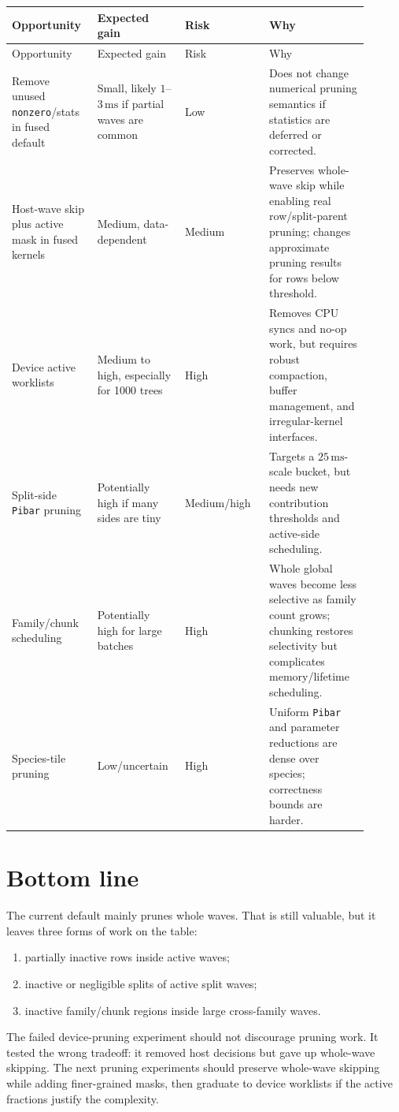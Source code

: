\documentclass[11pt]{article}
\newcommand{\ms}{\,\mathrm{ms}}
\newcommand{\code}[1]{\texttt{#1}}
\begin{document}
\begin{longtable}{p{0.20\linewidth}p{0.22\linewidth}p{0.22\linewidth}p{0.26\linewidth}}
\toprule
Opportunity & Expected gain & Risk & Why \\
\midrule
\endfirsthead
\toprule
Opportunity & Expected gain & Risk & Why \\
\midrule
\endhead

Remove unused \code{nonzero}/stats in fused default & Small, likely $1$--$3\ms$ if partial waves are common & Low & Does not change numerical pruning semantics if statistics are deferred or corrected. \\

Host-wave skip plus active mask in fused kernels & Medium, data-dependent & Medium & Preserves whole-wave skip while enabling real row/split-parent pruning; changes approximate pruning results for rows below threshold. \\

Device active worklists & Medium to high, especially for 1000 trees & High & Removes CPU syncs and no-op work, but requires robust compaction, buffer management, and irregular-kernel interfaces. \\

Split-side \code{Pibar} pruning & Potentially high if many sides are tiny & Medium/high & Targets a $25\ms$-scale bucket, but needs new contribution thresholds and active-side scheduling. \\

Family/chunk scheduling & Potentially high for large batches & High & Whole global waves become less selective as family count grows; chunking restores selectivity but complicates memory/lifetime scheduling. \\

Species-tile pruning & Low/uncertain & High & Uniform \code{Pibar} and parameter reductions are dense over species; correctness bounds are harder. \\

\bottomrule
\end{longtable}

\section{Bottom line}

The current default mainly prunes whole waves.  That is still valuable, but it
leaves three forms of work on the table:

\begin{enumerate}[leftmargin=*]
\item partially inactive rows inside active waves;
\item inactive or negligible splits of active split waves;
\item inactive family/chunk regions inside large cross-family waves.
\end{enumerate}

The failed device-pruning experiment should not discourage pruning work.  It
tested the wrong tradeoff: it removed host decisions but gave up whole-wave
skipping.  The next pruning experiments should preserve whole-wave skipping
while adding finer-grained masks, then graduate to device worklists if the
active fractions justify the complexity.
\end{document}
